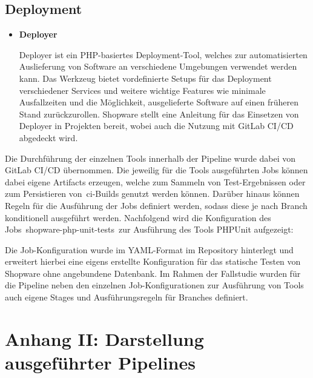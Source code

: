 \clearpage

\subsection*{Deployment}

\begin{itemize}
    \item {
        \textbf{Deployer}\par
        Deployer ist ein PHP-basiertes Deployment-Tool, welches zur automatisierten Auslieferung von Software an
        verschiedene Umgebungen verwendet werden kann.
        Das Werkzeug bietet vordefinierte Setups für das Deployment verschiedener Services und weitere wichtige
        Features wie minimale Ausfallzeiten und die Möglichkeit, ausgelieferte Software auf einen früheren Stand
        zurückzurollen.
        Shopware stellt eine Anleitung für das Einsetzen von Deployer in Projekten bereit, wobei auch die Nutzung mit
        GitLab CI/CD abgedeckt wird.
    }
\end{itemize}

Die Durchführung der einzelnen Tools innerhalb der Pipeline wurde dabei von GitLab CI/CD übernommen.
Die jeweilig für die Tools ausgeführten Jobs können dabei eigene Artifacts erzeugen, welche zum Sammeln von
Test-Ergebnissen oder zum Persistieren von\ \acrshort{ci}-Builds genutzt werden können.
Darüber hinaus können Regeln für die Ausführung der Jobs definiert werden, sodass diese je nach Branch konditionell
ausgeführt werden.
Nachfolgend wird die Konfiguration des Jobs\ \glqq shopware-php-unit-tests\grqq\ zur Ausführung des
Tools PHPUnit aufgezeigt:


Die Job-Konfiguration wurde im YAML-Format im Repository hinterlegt und erweitert hierbei eine eigens erstellte
Konfiguration für das statische Testen von Shopware ohne angebundene Datenbank.
Im Rahmen der Fallstudie wurden für die Pipeline neben den einzelnen Job-Konfigurationen zur Ausführung von Tools
auch eigene Stages und Ausführungsregeln für Branches definiert.

\clearpage

\section{Anhang II: Darstellung ausgeführter Pipelines} \label{sec:appendix-2}

